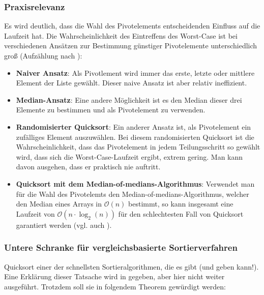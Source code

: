 \documentclass[11pt, a4paper, oneside, openright]{article}
\newcommand \vgl{vgl.\xspace }
\newcommand \Kap{Kap.\xspace }
\begin{document}
\subsubsection{Praxisrelevanz}
Es wird deutlich, dass die Wahl des Pivotelements entscheidenden Einfluss auf die Laufzeit hat. Die Wahrscheinlichkeit des Eintreffens des Worst-Case ist bei verschiedenen Ansätzen zur Bestimmung günstiger Pivotelemente unterschiedlich groß (Aufzählung nach \cite{wikiQS}):

\begin{itemize}

    \item \textbf{Naiver Ansatz}: Als Pivotlement wird immer das erste, letzte oder mittlere Element der Liste gewählt. Dieser naive Ansatz ist aber relativ ineffizient. 

    \item \textbf{Median-Ansatz}: Eine andere Möglichkeit ist es den Median dieser drei Elemente zu bestimmen und als Pivotelement zu verwenden. 

    \item \textbf{Randomisierter Quicksort}: Ein anderer Ansatz ist, als Pivotelement ein zufälliges Element auszuwählen. Bei diesem randomisierten Quicksort ist die Wahrscheinlichkeit, dass das Pivotelement in jedem Teilungsschritt so gewählt wird, dass sich die Worst-Case-Laufzeit ergibt, extrem gering. Man kann davon ausgehen, dass er praktisch nie auftritt.

    \item \textbf{Quicksort mit dem Median-of-medians-Algorithmus}: Verwendet man für die Wahl des Pivotelemts den Median-of-medians-Algorithmus, welcher den Median eines Arrays in $\mathcal{O}(n)$  bestimmt, so kann insgesamt eine Laufzeit von $\mathcal{O}\left(n\cdot \log_2{(n)}\right)$ für den schlechtesten Fall von Quicksort garantiert werden (\vgl auch \cite[\Kap\enquote{Analyse}]{uniflensburgQS}).

\end{itemize}





\subsubsection{Untere Schranke für vergleichsbasierte Sortierverfahren}
Quicksort einer der schnellsten Sortieralgorithmen, die es gibt (und geben kann!). Eine Erklärung dieser Tatsache wird in \cite[\Kap\enquote{Beweis der unteren Schranke für vergleichsbasiertes Sortieren}]{wikiSortierverfahren} gegeben, aber hier nicht weiter ausgeführt. Trotzdem soll sie in folgendem Theorem gewürdigt werden:
\end{document}
